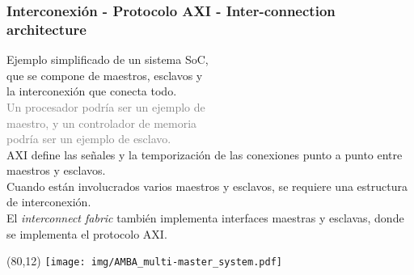 \documentclass[aspectratio=169]{beamer}
\begin{document}
\begin{frame}[t,fragile]
    \frametitle{Interconexión - Protocolo AXI - Inter-connection architecture}
    \vspace{0.3cm}
    Ejemplo simplificado de un sistema SoC,\\
    que se compone de maestros, esclavos y\\
    la interconexión que conecta todo.\\
    \pause
    \bigskip
    \textcolor{gray}{Un procesador podría ser un ejemplo de\\
    maestro, y un controlador de memoria\\
    podría ser un ejemplo de esclavo.}\\
    \pause
    \bigskip
    \small
    AXI define las señales y la temporización de las conexiones punto a punto entre maestros y esclavos.\\
    Cuando están involucrados varios maestros y esclavos, se requiere una estructura de interconexión.\\
    \bigskip
    \textcolor{verdeuca}{El \emph{interconnect fabric} también implementa interfaces maestras y esclavas, donde se implementa el protocolo AXI.}
    \begin{textblock}{10}(80,12) \texttt{[image: img/AMBA\_multi-master\_system.pdf]} \end{textblock}
\end{frame}
\end{document}
